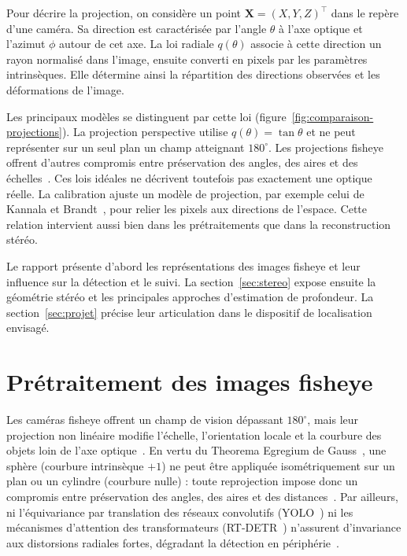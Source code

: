 \documentclass[11pt,a4paper]{article}
\renewcommand{\emph}[1]{\textup{#1}}
\begin{document}
Pour décrire la projection, on considère un point $\mathbf{X}=(X,Y,Z)^\top$ dans le repère d'une caméra. Sa direction est caractérisée par l'angle $\theta$ à l'axe optique et l'azimut $\phi$ autour de cet axe. La loi radiale $q(\theta)$ associe à cette direction un rayon normalisé dans l'image, ensuite converti en pixels par les paramètres intrinsèques. Elle détermine ainsi la répartition des directions observées et les déformations de l'image.

Les principaux modèles se distinguent par cette loi (figure~\ref{fig:comparaison-projections}). La projection perspective utilise $q(\theta)=\tan\theta$ et ne peut représenter sur un seul plan un champ atteignant $180^\circ$. Les projections fisheye offrent d'autres compromis entre préservation des angles, des aires et des échelles~\cite{schneider2009}. Ces lois idéales ne décrivent toutefois pas exactement une optique réelle. La calibration ajuste un modèle de projection, par exemple celui de Kannala et Brandt~\cite{kannala2006}, pour relier les pixels aux directions de l'espace. Cette relation intervient aussi bien dans les prétraitements que dans la reconstruction stéréo.



Le rapport présente d'abord les représentations des images fisheye et leur influence sur la détection et le suivi. La section~\ref{sec:stereo} expose ensuite la géométrie stéréo et les principales approches d'estimation de profondeur. La section~\ref{sec:projet} précise leur articulation dans le dispositif de localisation envisagé.


\section{Prétraitement des images fisheye}
\label{sec:pretraitement}
Les caméras fisheye offrent un champ de vision dépassant $180^\circ$, mais leur projection non linéaire modifie l'échelle, l'orientation locale et la courbure des objets loin de l'axe optique~\cite{kannala2006,hughes2008}. En vertu du \emph{Theorema Egregium} de Gauss~\cite{gauss1827,docarmo1976}, une sphère (courbure intrinsèque $+1$) ne peut être appliquée isométriquement sur un plan ou un cylindre (courbure nulle) : toute reprojection impose donc un compromis entre préservation des angles, des aires et des distances~\cite{snyder1987}. Par ailleurs, ni l'équivariance par translation des réseaux convolutifs (YOLO~\cite{redmon2016yolo}) ni les mécanismes d'attention des transformateurs (RT-DETR~\cite{zhao2024}) n'assurent d'invariance aux distorsions radiales fortes, dégradant la détection en périphérie~\cite{yogamani2019,gochoo2023}.
\end{document}
